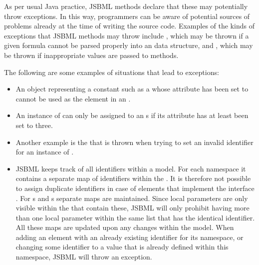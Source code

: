 As per usual Java practice, JSBML methods declare that these may
potentially throw exceptions. In this way, programmers can be aware of
potential sources of problems already at the time of writing the source
code. Examples of the kinds of exceptions that JSBML methods may throw
include \ParseException,  which may
be thrown if a given formula cannot be parsed properly into an \ASTNode
data structure, and \InvalidArgumentException,
 which may be thrown if
inappropriate values are passed to methods.

The following are some examples of situations that lead to exceptions:

\begin{itemize}

\item An object representing a constant such as a
  \Parameter whose  attribute has been set to 
  cannot be used as the \Variable element in an \Assignment.

\item An instance of \Priority can only be assigned to an \Event{}s if its
   attribute has at least been set to
  three.

\item Another example is the \InvalidArgumentException that is thrown when
  trying to set an invalid identifier \String for an instance of
  \AbstractNamedSBase.

\item JSBML keeps track of all identifiers within a model. For each
  namespace it contains a separate map of identifiers within the \Model. It
  is therefore not possible to assign duplicate identifiers in case of
  elements that implement the interface \UniqueNamedSBase.  For
  \UnitDefinition{}s and \LocalParameter{}s separate maps are
  maintained. Since local parameters are only visible within the
  \KineticLaw that contain these, JSBML will only prohibit having more
  than one local parameter within the same list that has the identical
  identifier. All these maps are updated upon any changes within the
  model. When adding an element with an already existing identifier for its
  namespace, or changing some identifier to a value that is already defined
  within this namespace, JSBML will throw an exception.


\end{itemize}
